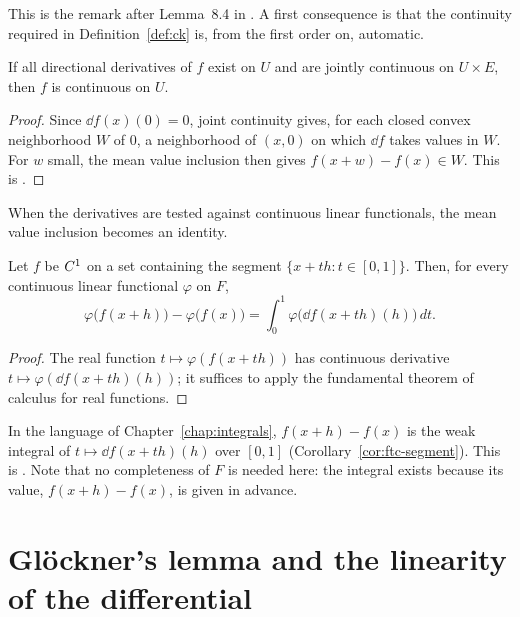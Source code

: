 This is the remark after Lemma~8.4 in \cite{Mic80}. A first consequence is that the continuity
required in Definition~\ref{def:ck} is, from the first order on, automatic.

\begin{lemma}[Continuity]
  \label{lem:continuity}
  \leanok
  If all directional derivatives of $f$ exist on $U$ and are jointly continuous on $U \times E$,
  then $f$ is continuous on $U$.
\end{lemma}

\begin{proof}
  \leanok
  Since $\dd f(x)(0) = 0$, joint continuity gives, for each closed convex neighborhood $W$ of
  $0$, a neighborhood of $(x, 0)$ on which $\dd f$ takes values in $W$. For $w$ small, the
  mean value inclusion then gives $f(x + w) - f(x) \in W$. This is \cite[8.1]{Mic80}.
\end{proof}

When the derivatives are tested against continuous linear functionals, the mean value inclusion
becomes an identity.

\begin{proposition}
  \label{prop:mean-value-weak}
  \leanok
  Let $f$ be $C^{1}$ on a set containing the segment $\{x + t h : t \in [0,1]\}$. Then, for
  every continuous linear functional $\varphi$ on $F$,
  \[
    \varphi\bigl(f(x+h)\bigr) - \varphi\bigl(f(x)\bigr)
      = \int_0^1 \varphi\bigl(\dd f(x + t h)(h)\bigr)\, dt .
  \]
\end{proposition}

\begin{proof}
  \leanok
  The real function $t \mapsto \varphi(f(x + t h))$ has continuous derivative
  $t \mapsto \varphi(\dd f(x + th)(h))$; it suffices to apply the fundamental theorem of
  calculus for real functions.
\end{proof}

In the language of Chapter~\ref{chap:integrals}, $f(x+h) - f(x)$ is the weak integral of
$t \mapsto \dd f(x + th)(h)$ over $[0,1]$ (Corollary~\ref{cor:ftc-segment}). This is \cite[1.2.6]{GN26}.
Note that no completeness of $F$ is needed here: the integral exists because its value,
$f(x+h) - f(x)$, is given in advance.

\section{Glöckner's lemma and the linearity of the differential}

